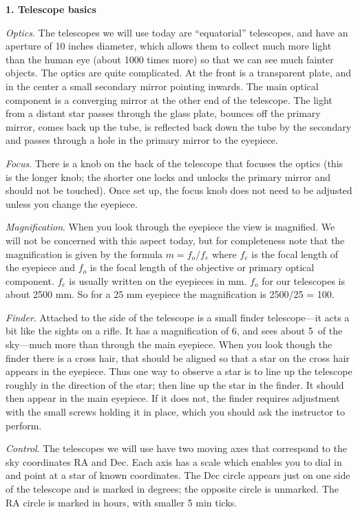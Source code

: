 \medskip
\bigskip
\noindent
{\bf 1. Telescope basics}

\medskip
\noindent
\emph{Optics}. The telescopes we will use today are ``equatorial''
telescopes, and have an aperture of 10 inches diameter, which allows
them to collect much more light than the human eye (about 1000 times
more) so that we can see much fainter objects.  The optics are quite
complicated. At the front is a transparent plate, and in the center a
small secondary mirror pointing inwards. The main optical component is
a converging mirror at the other end of the telescope. The light from
a distant star passes through the glass plate, bounces off the primary
mirror, comes back up the tube, is reflected back down the tube by the
secondary and passes through a hole in the primary mirror to the
eyepiece.

\medskip \noindent
\emph{Focus}.
There is a knob on the back of the telescope that focuses the optics
(this is the longer knob; the shorter one locks and unlocks the
primary mirror and should not be touched). Once set up, the focus knob
does not need to be adjusted unless you change the eyepiece.

\medskip \noindent
\emph{Magnification}. When you look through the eyepiece the
view is magnified. We will not be concerned with this aspect today,
but for completeness note that the magnification is given by
the formula $m = f_o/f_e$ where $f_e$ is the focal length of the
eyepiece and $f_o$ is the focal length of the objective or primary
optical component. $f_e$ is usually written on the eyepieces in
mm. $f_o$ for our telescopes is about 2500 mm. So for a 25 mm
eyepiece the magnification is 2500/25 = 100.

\medskip \noindent 
\emph{Finder}. Attached to the side of the telescope is a
small finder telescope---it acts a bit like the sights on a rifle. It
has a magnification of 6, and sees about 5\deg\ of the sky---much more
than through the main eyepiece. When you look though the finder there
is a cross hair, that should be aligned so that a star on the cross
hair appears in the eyepiece. Thus one way to observe a star is to
line up the telescope roughly in the direction of the star; then line
up the star in the finder. It should then appear in the main
eyepiece. If it does not, the finder requires adjustment with the
small screws holding it in place, which you should ask the instructor
to perform.

\medskip \noindent 
\emph{Control}. The telescopes we will use have two moving axes that
correspond to the sky coordinates RA and Dec. Each axis has a scale
which enables you to dial in and point at a star of known
coordinates. The Dec circle appears just on one side of the telescope
and is marked in degrees; the opposite circle is unmarked. The RA
circle is marked in hours, with smaller 5 min ticks.

